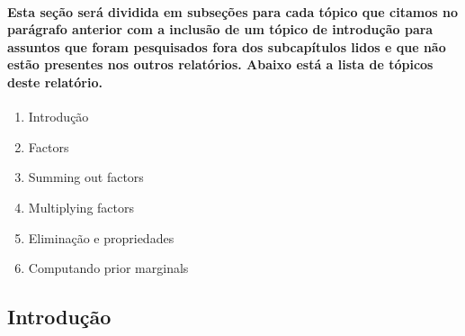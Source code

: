 \documentclass[a4paper,10pt]{article}
\theoremstyle{plain}
\begin{document}
\paragraph{
  Esta seção será dividida em subseções para cada tópico que citamos no parágrafo anterior com a
inclusão de um tópico de introdução para assuntos que foram pesquisados fora dos subcapítulos lidos
e que não estão presentes nos outros relatórios. Abaixo está a lista de tópicos deste relatório.
}

\begin{enumerate}
  \item Introdução
  \item Factors
  \item Summing out factors
  \item Multiplying factors
  \item Eliminação e propriedades
  \item Computando prior marginals
\end{enumerate}

\subsection{Introdução}

\newpage

\printbibliography
\end{document}
